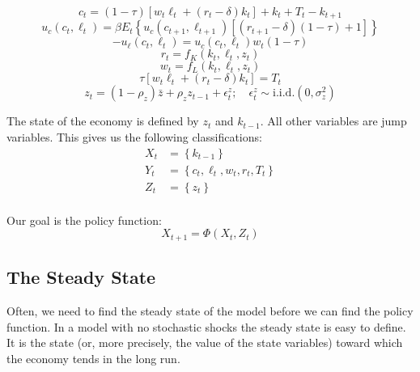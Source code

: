 \documentclass[letterpaper,12pt]{article}
\theoremstyle{definition}
\begin{document}
\begin{spacing}{1.5}
		\begin{equation}\label{DSGE_BC22HouseholdSpec}
		c_t = (1-\tau) \left[w_t\ell_t+(r_t-\delta)k_t\right] + k_t + T_t-k_{t+1}
		\end{equation}
		\begin{equation}\label{DSGE_Euler22HouseholdDSGE}
		u_c(c_t,\ell_t) = \beta E_t\left\{ u_c(c_{t+1},\ell_{t+1})[(r_{t+1}-\delta)(1-\tau)+1] \right\}
		\end{equation}
		\begin{equation}\label{DSGE_EulerB2HouseholdSpec}
		-u_{\ell}(c_t,\ell_t) = u_{c}(c_t,\ell_t)w_t(1-\tau)
		\end{equation}
		\begin{equation}\label{DSGE_FOC012FirmSpec}
		r_t = f_K(k_t,\ell_t,z_t)
		\end{equation}
		\begin{equation}\label{DSGE_FOC022FirmSpec}
		w_t = f_L(k_t,\ell_t,z_t)
		\end{equation}
		\begin{equation}
		\tau \left[w_t\ell_t+(r_t-\delta)k_t\right] = T_t
		\end{equation}
		\begin{equation}\label{DSGE_LoM2Spec}
		z_t = (1-\rho_z)\bar z +  \rho_z z_{t-1}+ \epsilon^z_t ;\quad \epsilon^z_t\sim\text{i.i.d.}(0,\sigma_z^2)
		\end{equation}

		The state of the economy is defined by $z_t$ and $k_{t-1}$. All other variables are jump variables. This gives us the following classifications:
		\begin{equation}\label{DSGE_XYZSpec}
		\begin{split}
		X_t & = \left\{k_{t-1}\right\} \\
		Y_t & = \left\{c_t,\ell_t,w_t,r_t,T_t\right\} \\
		Z_t & = \left\{z_t\right\} \\
		\end{split}
		\end{equation}

		Our goal is the policy function:
		\begin{equation}
		X_{t+1} = \Phi (X_t,Z_t)
		\end{equation}

	\subsection{The Steady State}\label{DSGE_SS}
		Often, we need to find the steady state of the model before we can find the policy function. In a model with no stochastic shocks the steady state is easy to define. It is the state (or, more precisely, the value of the state variables) toward which the economy tends in the long run.


\end{spacing}
\end{document}
